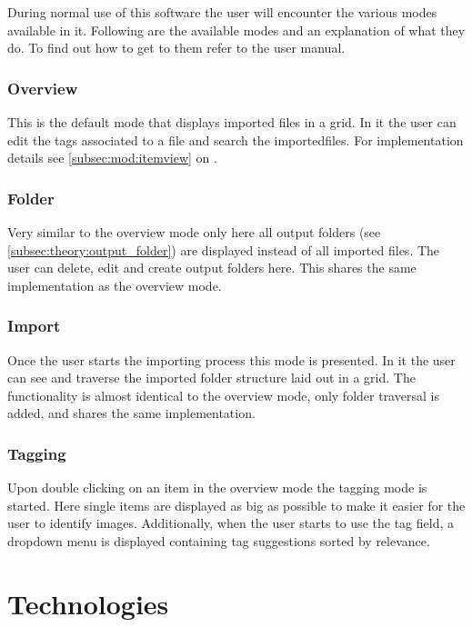 During normal use of this software the user will encounter the various modes
available in it. Following are the available modes and an explanation of what
they do. To find out how to get to them refer to the user manual.

\subsubsection{Overview}%
\label{theory:overview_mode}

This is the default mode that displays imported files in a grid. In it the user
can edit the tags associated to a file and search the importedfiles. For
implementation details see \cref{subsec:mod:itemview} on
.

\subsubsection{Folder}%
\label{theory:folder_mode}

Very similar to the overview mode only here all output folders (see
\cref{subsec:theory:output_folder}) are displayed instead of all imported
files. The user can delete, edit and create output folders here. This shares
the same implementation as the overview mode.

\subsubsection{Import}%
\label{theory:import_mode}

Once the user starts the importing process this mode is presented. In it the
user can see and traverse the imported folder structure laid out in a grid. The
functionality is almost identical to the overview mode, only folder traversal
is added, and shares the same implementation.

\subsubsection{Tagging}%
\label{theory:tagging_mode}

Upon double clicking on an item in the overview mode the tagging mode is
started. Here single items are displayed as big as possible to make it easier
for the user to identify images. Additionally, when the user starts to use the
tag field, a dropdown menu is displayed containing tag suggestions sorted by
relevance.

\section{Technologies}
\def\kapitelautor{Christoph Führer}
